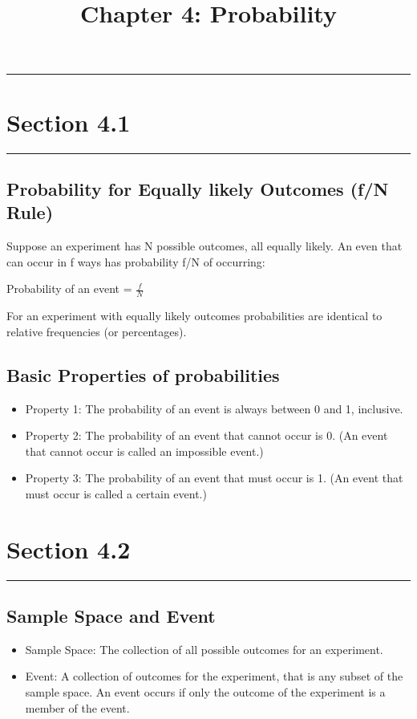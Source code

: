 \documentclass[12pt]{article}
\title{Chapter 4: Probability}
\author{}
\begin{document}
    \maketitle
    \noindent\rule{\textwidth}{0.4pt}
    \section*{Section 4.1}
    \noindent\rule{\textwidth}{0.4pt}
        \subsection*{Probability for Equally likely Outcomes (f/N Rule)}
            Suppose an experiment has N possible outcomes, all equally likely. An even that can
            occur in f ways has probability f/N of occurring:
            \begin{center}
                Probability of an event = $\frac{f}{N}$     
            \end{center}
            For an experiment with equally likely outcomes probabilities are identical to relative 
            frequencies (or percentages).
        \subsection{Basic Properties of probabilities}
            \begin{itemize}
                \item Property 1: The probability of an event is always between 0 and 1, inclusive.
                \item Property 2: The probability of an event that cannot occur is 0. (An event 
                that cannot occur is called an impossible event.)
                \item Property 3: The probability of an event that must occur is 1. (An event that 
                must occur is called a certain event.)
            \end{itemize}
    \section*{Section 4.2}
    \noindent\rule{\textwidth}{0.4pt}
        \subsection*{Sample Space and Event}
            \begin{itemize}
                \item Sample Space: The collection of all possible outcomes for an experiment.
                \item Event: A collection of outcomes for the experiment, that is any subset of the
                sample space. An event occurs if only the outcome of the experiment is a member of
                the event.
            \end{itemize}
\end{document}
